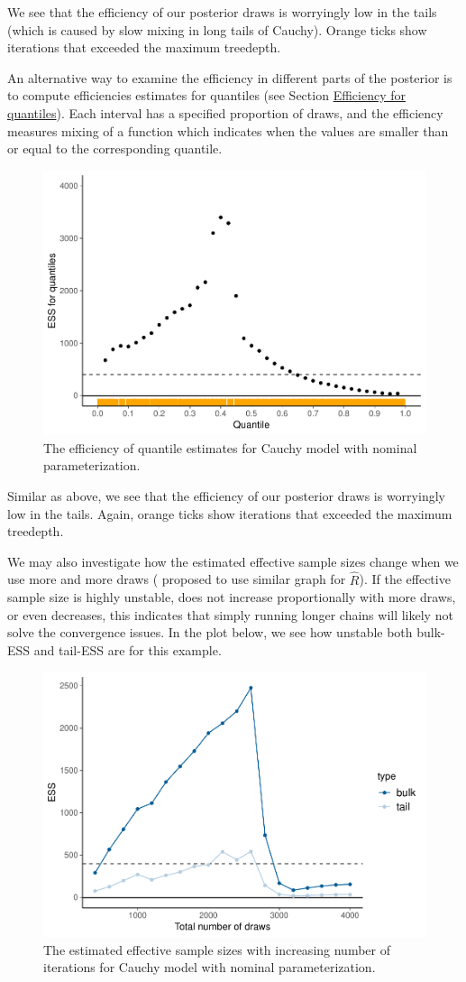 \documentclass[american,]{article}
\begin{document}
We see that the efficiency of our posterior draws is worryingly low in
the tails (which is caused by slow mixing in long tails of Cauchy).
Orange ticks show iterations that exceeded the maximum treedepth.

An alternative way to examine the efficiency in different parts of the
posterior is to compute efficiencies estimates for quantiles (see
Section \protect\hyperlink{quantile_S_eff}{Efficiency for quantiles}).
Each interval has a specified proportion of draws, and the efficiency
measures mixing of a function which indicates when the values are
smaller than or equal to the corresponding quantile.

\begin{figure}[t]
  \centering
  \includegraphics[width=0.6\linewidth]{graphics/quantile-ess-fit-nom-1.pdf}
  \caption{The efficiency of quantile estimates for Cauchy model with nominal parameterization.}
\end{figure}

Similar as above, we see that the efficiency of our posterior draws is
worryingly low in the tails. Again, orange ticks show iterations that
exceeded the maximum treedepth.

We may also investigate how the estimated effective sample sizes change
when we use more and more draws (\citet{Brooks+Gelman:1998} proposed to
use similar graph for \(\widehat{R}\)). If the effective sample size is
highly unstable, does not increase proportionally with more draws, or
even decreases, this indicates that simply running longer chains will
likely not solve the convergence issues. In the plot below, we see how
unstable both bulk-ESS and tail-ESS are for this example.

\begin{figure}[t]
  \centering
  \includegraphics[width=0.6\linewidth]{graphics/change-ess-fit-nom-1.pdf}
  \caption{The estimated effective sample sizes with increasing number of iterations for Cauchy model with nominal parameterization.}
\end{figure}
\end{document}
